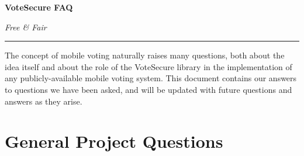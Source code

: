\documentclass[12pt,letter]{article}
\begin{document}
\begin{center}
{\Large \textbf{VoteSecure FAQ}}
\end{center}
\vspace{-6pt}

\textit{Free \& Fair} \hspace{\fill} \textit{\DTMtoday}

\vspace{-12pt}

\rule{\textwidth}{1pt}

The concept of mobile voting naturally raises many questions, both about the idea itself and about the role of the VoteSecure library in the implementation of any publicly-available mobile voting system. This document contains our answers to questions we have been asked, and will be updated with future questions and answers as they arise.


\section{General Project Questions}
\end{document}
